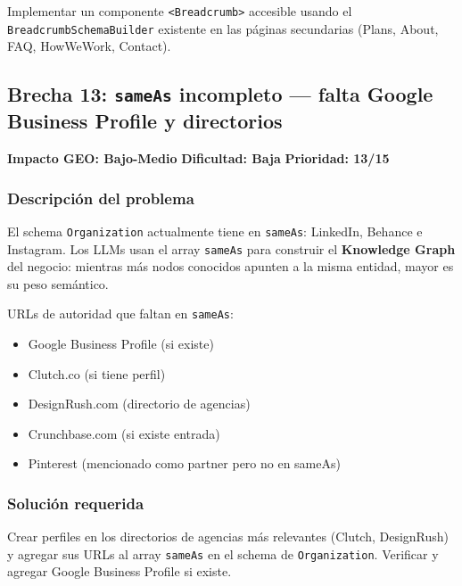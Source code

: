 \documentclass[12pt, a4paper]{article}
\begin{document}
Implementar un componente \texttt{<Breadcrumb>} accesible usando el \texttt{BreadcrumbSchemaBuilder} existente en las páginas secundarias (Plans, About, FAQ, HowWeWork, Contact).

\subsection{Brecha 13: \texttt{sameAs} incompleto — falta Google Business Profile y directorios}

\begin{lowbox}
\textbf{Impacto GEO: Bajo-Medio} \quad \textbf{Dificultad: Baja} \quad \textbf{Prioridad: 13/15}
\end{lowbox}

\subsubsection{Descripción del problema}

El schema \texttt{Organization} actualmente tiene en \texttt{sameAs}: LinkedIn, Behance e Instagram. Los LLMs usan el array \texttt{sameAs} para construir el \textbf{Knowledge Graph} del negocio: mientras más nodos conocidos apunten a la misma entidad, mayor es su peso semántico.

URLs de autoridad que faltan en \texttt{sameAs}:
\begin{itemize}[itemsep=3pt]
  \item Google Business Profile (si existe)
  \item Clutch.co (si tiene perfil)
  \item DesignRush.com (directorio de agencias)
  \item Crunchbase.com (si existe entrada)
  \item Pinterest (mencionado como partner pero no en sameAs)
\end{itemize}

\subsubsection{Solución requerida}

Crear perfiles en los directorios de agencias más relevantes (Clutch, DesignRush) y agregar sus URLs al array \texttt{sameAs} en el schema de \texttt{Organization}. Verificar y agregar Google Business Profile si existe.
\end{document}

